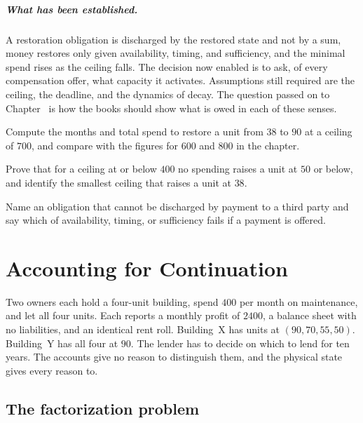 \paragraph{What has been established.} A restoration obligation is discharged by the restored state and not by a sum, money restores only given availability, timing, and sufficiency, and the minimal spend rises as the ceiling falls. The decision now enabled is to ask, of every compensation offer, what capacity it activates. Assumptions still required are the ceiling, the deadline, and the dynamics of decay. The question passed on to Chapter~ is how the books should show what is owed in each of these senses.

\begin{exercise}
Compute the months and total spend to restore a unit from $38$ to $90$ at a ceiling of $700$, and compare with the figures for $600$ and $800$ in the chapter.
\end{exercise}
\begin{exercise}
Prove that for a ceiling at or below $400$ no spending raises a unit at $50$ or below, and identify the smallest ceiling that raises a unit at $38$.
\end{exercise}
\begin{exercise}
Name an obligation that cannot be discharged by payment to a third party and say which of availability, timing, or sufficiency fails if a payment is offered.
\end{exercise}

\chapter{Accounting for Continuation}\label{ch:20}

Two owners each hold a four-unit building, spend $400$ per month on maintenance, and let all four units. Each reports a monthly profit of $2400$, a balance sheet with no liabilities, and an identical rent roll. Building~X has units at $(90,70,55,50)$. Building~Y has all four at $90$. The lender has to decide on which to lend for ten years. The accounts give no reason to distinguish them, and the physical state gives every reason to.

\section{The factorization problem}


